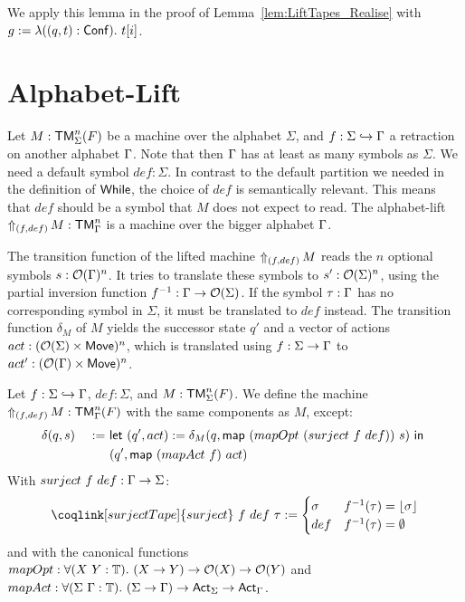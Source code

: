 We apply this lemma in the proof of Lemma~\ref{lem:LiftTapes_Realise} with $g := \lambda ((q,t):\Conf).~t[i]$.



\section{Alphabet-Lift}
\label{sec:sigma-Lift}
%

Let $M : \TM_\Sigma^n(F)$ be a machine over the alphabet $\Sigma$, and $f : \Sigma \hookrightarrow \Tau$ a retraction on another alphabet $\Tau$.
Note that then $\Tau$ has at least as many symbols as $\Sigma$.  We need a default symbol $def:\Sigma$.  In contrast to the default partition we
needed in the definition of $\While$, the choice of $def$ is semantically relevant.  This means that $def$ should be a symbol that $M$ does not expect
to read.  The alphabet-lift $\LiftAlphabet{M}{(f,def)} : \TM_\Tau^n$ is a machine over the bigger alphabet $\Tau$.

The transition function of the lifted machine $\LiftAlphabet{M}{(f,def)}$ reads the $n$ optional symbols $s : \Option(\Tau)^n$.  It tries to translate
these symbols to $s': \Option(\Sigma)^n$, using the partial inversion function $f^{-1} : \Tau \to \Option(\Sigma)$.  If the symbol $\tau:\Tau$ has no
corresponding symbol in $\Sigma$, it must be translated to $def$ instead.  The transition function $\delta_M$ of $M$ yields the successor state $q'$
and a vector of actions $act: (\Option(\Sigma) \times \MS{Move})^n$, which is translated using $f:\Sigma\to\Tau$ to
$act' : (\Option(\Tau) \times \MS{Move})^n$.

\begin{definition}
  \label{def:LiftAlphabet}
  Let $f : \Sigma \hookrightarrow \Tau$, $def:\Sigma$, and $M : \TM_\Sigma^n(F)$.  We define the machine %
  $\LiftAlphabet{M}{(f,def)} : \TM_\Tau^n(F)$ with the same components as $M$, except:
  \begin{alignat*}{2}
    & \delta(q,s)    &~:=~& \Let{(q', act) := \delta_M(q, \map{(mapOpt~(surject~f~def))}{s})}{\\%
    &                &~  ~& (q', \map{(mapAct~f)}{act})} \\
  \end{alignat*}
  With $surject~f~def : \Tau \to \Sigma$:
  \[
    \coqlink[surjectTape]{surject}~f~def~\tau :=
    \begin{cases}
      \sigma & f^{-1}(\tau) = \Some{\sigma} \\
      def & f^{-1}(\tau) = \None
    \end{cases}
  \]
  and with the canonical functions $mapOpt: \forall (X~Y:\Type).~ (X \to Y) \to \Option(X) \to \Option(Y)$ and
  $mapAct : \forall (\Sigma~\Tau:\Type).~(\Sigma\to\Tau) \to \Act_\Sigma \to \Act_\Tau$.
\end{definition}

